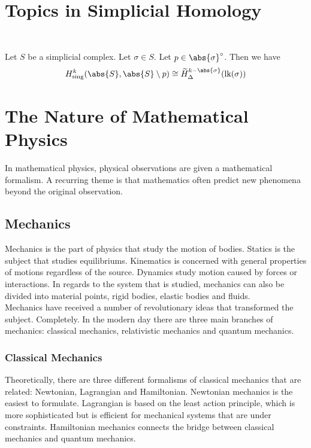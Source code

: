 \documentclass[a4paper]{article}
\begin{document}
\pagebreak
\section{Topics in Simplicial Homology}
\subsection{}
\begin{prp}{}{}\\
Let $S$ be a simplicial complex. Let $\sigma\in S$. Let $p\in\abs{\sigma}^\circ$. Then we have $$H_\text{sing}^k(\abs{S},\abs{S}\setminus p)\cong\widetilde{H}_\Delta^{k-\abs{\sigma}}(\text{lk}(\sigma))$$
\end{prp}

\pagebreak
\section{The Nature of Mathematical Physics}
In mathematical physics, physical observations are given a mathematical formalism. A recurring theme is that mathematics often predict new phenomena beyond the original observation. 

\subsection*{Mechanics}
Mechanics is the part of physics that study the motion of bodies. Statics is the subject that studies equilibriums. Kinematics is concerned with general properties of motions regardless of the source. Dynamics study motion caused by forces or interactions. In regards to the system that is studied, mechanics can also be divided into material points, rigid bodies, elastic bodies and fluids. \\

Mechanics have received a number of revolutionary ideas that transformed the subject. Completely. In the modern day there are three main branches of mechanics: classical mechanics, relativistic mechanics and quantum mechanics. 

\subsubsection*{Classical Mechanics}
Theoretically, there are three different formalisms of classical mechanics that are related: Newtonian, Lagrangian and Hamiltonian. Newtonian mechanics is the easiest to formulate. Lagrangian is based on the least action principle, which is more sophisticated but is efficient for mechanical systems that are under constraints. Hamiltonian mechanics connects the bridge between classical mechanics and quantum mechanics. 
\end{document}
